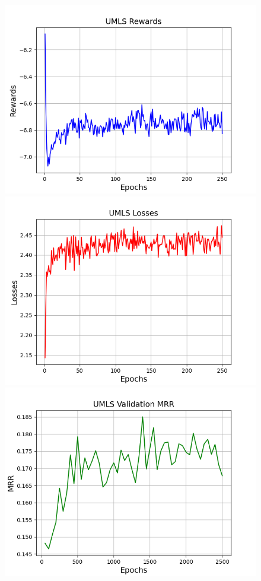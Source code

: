 \begin{figure}
    \centering
    \begin{minipage}{.5\textwidth}
      \centering
      \includegraphics[width=0.9\linewidth]{appendices/umls/random/gan_train_umls_rewards.png}
    \end{minipage}%
    \begin{minipage}{.5\textwidth}
      \centering
      \includegraphics[width=0.9\linewidth]{appendices/umls/random/gan_train_umls_losses.png}
    \end{minipage}
    \begin{minipage}{.5\textwidth}
      \centering
      \includegraphics[width=0.9\linewidth]{appendices/umls/random/gan_train_umls_mrr.png}

\end{minipage}
\end{figure}

